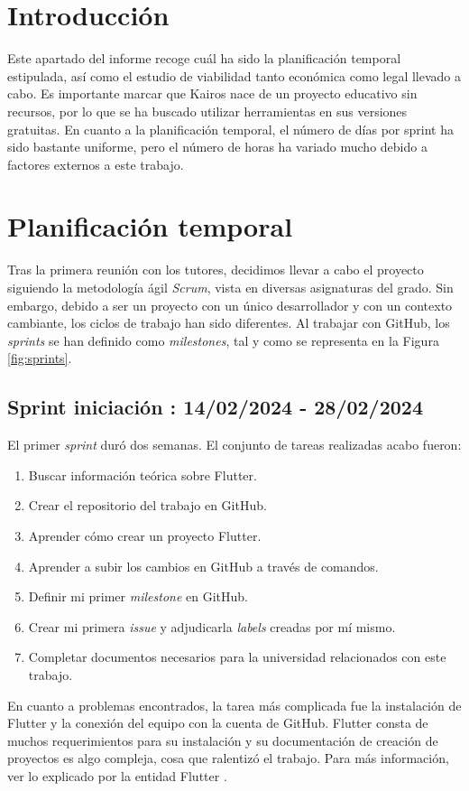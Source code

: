 
\section{Introducción}

	Este apartado del informe recoge cuál ha sido la planificación temporal estipulada, así como el estudio de viabilidad tanto económica como legal llevado a cabo. Es importante marcar que Kairos nace de un proyecto educativo sin recursos, por lo que se ha buscado utilizar herramientas en sus versiones gratuitas. En cuanto a la planificación temporal, el número de días por sprint ha sido bastante uniforme, pero el número de horas ha variado mucho debido a factores externos a este trabajo.	

\section{Planificación temporal}

	Tras la primera reunión con los tutores, decidimos llevar a cabo el proyecto siguiendo la metodología ágil \emph{Scrum}, vista en diversas asignaturas del grado. Sin embargo, debido a ser un proyecto con un único desarrollador y con un contexto cambiante, los ciclos de trabajo han sido diferentes. Al trabajar con GitHub, los \emph{sprints} se han definido como \emph{milestones}, tal y como se representa en la Figura \ref{fig:sprints}.
	

\subsection{Sprint iniciación : 14/02/2024 - 28/02/2024}

	El primer \emph{sprint} duró dos semanas. El conjunto de tareas realizadas acabo fueron:
	\begin{enumerate}
		\item Buscar información teórica sobre Flutter.
		\item Crear el repositorio del trabajo en GitHub.
		\item Aprender cómo crear un proyecto Flutter.
		\item Aprender a subir los cambios en GitHub a través de comandos.
		\item Definir mi primer \emph{milestone} en GitHub.
		\item Crear mi primera \emph{issue} y adjudicarla \emph{labels} creadas por mí mismo.
		\item Completar documentos necesarios para la universidad relacionados con este trabajo.
	\end{enumerate}
	En cuanto a problemas encontrados, la tarea más complicada fue la instalación de Flutter y la conexión del equipo con la cuenta de GitHub. Flutter consta de muchos requerimientos para su instalación y su documentación de creación de proyectos es algo compleja, cosa que ralentizó el trabajo. Para más información, ver lo explicado por la entidad Flutter \cite{flutter}.
	
